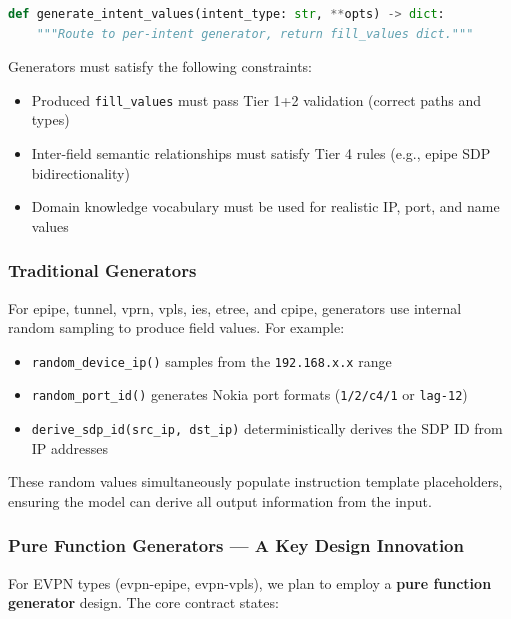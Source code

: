 \documentclass[12pt, a4paper]{article}
\newcommand{\fillvalues}{\texttt{fill\_values}}
\begin{document}
\begin{lstlisting}[language=Python, caption={Unified dispatch interface}]
def generate_intent_values(intent_type: str, **opts) -> dict:
    """Route to per-intent generator, return fill_values dict."""
\end{lstlisting}

\noindent
Generators must satisfy the following constraints:

\begin{itemize}
  \item Produced \fillvalues{} must pass Tier 1+2 validation (correct paths and types)
  \item Inter-field semantic relationships must satisfy Tier 4 rules (e.g., epipe SDP bidirectionality)
  \item Domain knowledge vocabulary must be used for realistic IP, port, and name values
\end{itemize}

\subsubsection{Traditional Generators}

For epipe, tunnel, vprn, vpls, ies, etree, and cpipe, generators use internal random sampling to produce field values. For example:

\begin{itemize}
  \item \texttt{random\_device\_ip()} samples from the \texttt{192.168.x.x} range
  \item \texttt{random\_port\_id()} generates Nokia port formats (\texttt{1/2/c4/1} or \texttt{lag-12})
  \item \texttt{derive\_sdp\_id(src\_ip, dst\_ip)} deterministically derives the SDP ID from IP addresses
\end{itemize}

These random values simultaneously populate instruction template placeholders, ensuring the model can derive all output information from the input.

\subsubsection{Pure Function Generators --- A Key Design Innovation}
\label{sec:pure-function}

For EVPN types (evpn-epipe, evpn-vpls), we plan to employ a \textbf{pure function generator} design. The core contract states:
\end{document}

